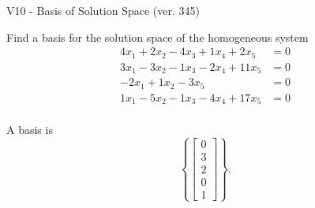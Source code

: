 \begin{exercise}
  \begin{exerciseTitle}V10 - Basis of Solution Space (ver. 345)\end{exerciseTitle}
  \begin{exerciseStatement}
    Find a basis for the solution space of the homogeneous system 
\begin{align*}
 4 x_ 1 + 2 x_ 2 -4 x_ 3 + 1 x_ 4 + 2 x_ 5 &= 0  \\ 
  3 x_ 1 -3 x_ 2 -1 x_ 3 -2 x_ 4 + 11 x_ 5 &= 0  \\ 
  -2 x_ 1 + 1 x_ 2 -3 x_ 5 &= 0  \\ 
  1 x_ 1 -5 x_ 2 -1 x_ 3 -4 x_ 4 + 17 x_ 5 &= 0  \\ 
 \end{align*}


 
  \end{exerciseStatement}

  \begin{exerciseAnswer}
   A basis is   
\[\left\{\left[\begin{array}{c}
0 \\
3 \\
2 \\
0 \\
1
\end{array}\right]\right\}.\]

  


  \end{exerciseAnswer}
\end{exercise}